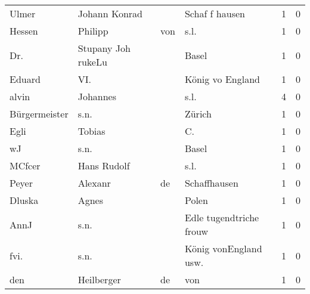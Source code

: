 \begin{center}
\begin{tiny}
\begin{longtabu}{llllrr}
                    Ulmer &                      Johann Konrad &             &                              Schaf f hausen &          1 &         0 \\
                   Hessen &                            Philipp &         von &                                        s.l. &          1 &         0 \\
                      Dr. &                 Stupany Joh rukeLu &             &                                       Basel &          1 &         0 \\
                   Eduard &                                VI. &             &                            König vo England &          1 &         0 \\
                    alvin &                           Johannes &             &                                        s.l. &          4 &         0 \\
            Bürgermeister &                               s.n. &             &                                      Zürich &          1 &         0 \\
                     Egli &                             Tobias &             &                                         C.  &          1 &         0 \\
                       wJ &                               s.n. &             &                                       Basel &          1 &         0 \\
                   MCfcer &                        Hans Rudolf &             &                                        s.l. &          1 &         0 \\
                    Peyer &                            Alexanr &          de &                                Schaffhausen &          1 &         0 \\
                   Dluska &                              Agnes &             &                                       Polen &          1 &         0 \\
                     AnnJ &                               s.n. &             &                     Edle tugendtriche frouw &          1 &         0 \\
                     fvi. &                               s.n. &             &                      König vonEngland usw.  &          1 &         0 \\
                      den &                         Heilberger &          de &                                         von &          1 &         0 \\

\end{longtabu}
\end{tiny}
\end{center}
